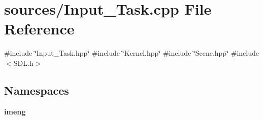 \section{sources/\+Input\+\_\+\+Task.cpp File Reference}
\label{_input___task_8cpp}
{\ttfamily \#include \char`\"{}Input\+\_\+\+Task.\+hpp\char`\"{}}\newline
{\ttfamily \#include \char`\"{}Kernel.\+hpp\char`\"{}}\newline
{\ttfamily \#include \char`\"{}Scene.\+hpp\char`\"{}}\newline
{\ttfamily \#include $<$S\+D\+L.\+h$>$}\newline
\subsection*{Namespaces}
\begin{DoxyCompactItemize}
\item 
 \textbf{ imeng}
\end{DoxyCompactItemize}
